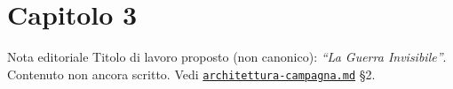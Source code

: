 \chapter*{Capitolo 3}
\label{chap:capitolo3}

\begin{DndComment}[]{Nota editoriale}
  Titolo di lavoro proposto (non canonico): \textit{``La Guerra Invisibile''}. Contenuto non ancora scritto. Vedi \href{https://github.com/fpetrulio/child-of-balance/blob/main/docs/01-campaign-design/architettura-campagna.md}{\texttt{architettura-campagna.md}} §2.
\end{DndComment}
